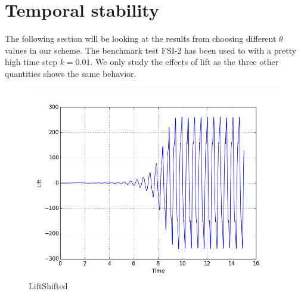 \section{Temporal stability}
The following section will be looking at the results from choosing different $\theta$ values in our scheme. The benchmark test FSI-2 has been used to with a pretty high time step $ k = 0.01$. We only study the effects of lift as the three other quantities shows the same behavior.   
\begin{figure}[H]
\label{fig:lift_shifted}
\caption{LiftShifted}
\includegraphics[scale=0.6, trim={0mm 0mm 0mm 0mm},clip]{./Verification_Validation/Temporal_stability/lift_shifted.png}
\end{figure}
